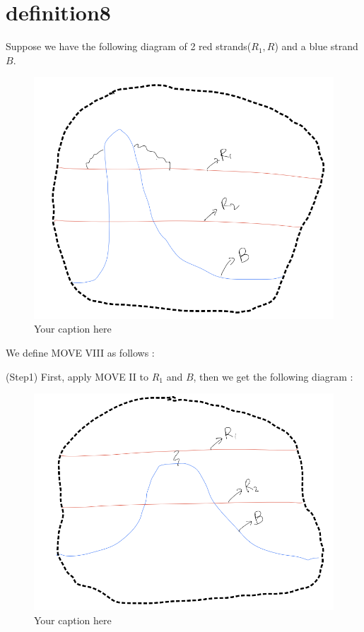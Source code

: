 \section{definition8}
\begin{definition}
\end{definition}

Suppose we have the following diagram of 2 red strands($R_1,R$) and a blue strand $B$.

\begin{figure}[H] %
    \centering
    \includegraphics[width=\linewidth]{diagrams/definition8/1.png} %
    \caption{Your caption here}
    \label{fig:your-label}
\end{figure}

We define MOVE \RN{8} as follows :

(Step1) First, apply MOVE \RN{2} to $R_1$ and $B$, then we get the following diagram :

\begin{figure}[H] %
    \centering
    \includegraphics[width=\linewidth]{diagrams/definition8/2.png} %
    \caption{Your caption here}
    \label{fig:your-label}
\end{figure}

